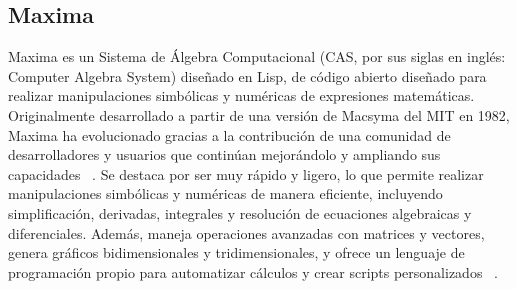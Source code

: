  

\subsection{Maxima}
Maxima es un Sistema de Álgebra Computacional (CAS, por sus siglas en inglés: Computer Algebra System) diseñado en Lisp, de código abierto diseñado para realizar manipulaciones simbólicas y numéricas de expresiones matemáticas. Originalmente desarrollado a partir de una versión de Macsyma del MIT en 1982, Maxima ha evolucionado gracias a la contribución de una comunidad de desarrolladores y usuarios que continúan mejorándolo y ampliando sus capacidades ~\cite{MaximaSourgeforce}.  \newline
Se destaca por ser muy rápido y ligero, lo que permite realizar manipulaciones simbólicas y numéricas de manera eficiente, incluyendo simplificación, derivadas, integrales y resolución de ecuaciones algebraicas y diferenciales. Además, maneja operaciones avanzadas con matrices y vectores, genera gráficos bidimensionales y tridimensionales, y ofrece un lenguaje de programación propio para automatizar cálculos y crear scripts personalizados ~\cite{MaximaSourgeforce}. 

